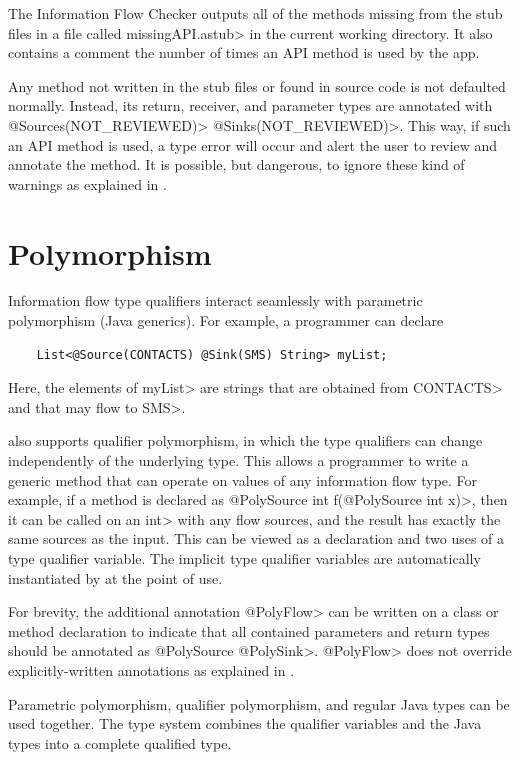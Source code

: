  The Information Flow Checker  outputs all of the methods missing from the stub files in
  a file called \<missingAPI.astub> in the current working directory. It also 
  contains a comment the number of times an API method is used by the app.

Any method not written in the stub files or found in source code is not defaulted normally. 
 Instead, its return, receiver, and parameter types are annotated with \<@Sources(NOT\_REVIEWED)> 
 \<@Sinks(NOT\_REVIEWED)>. 
 This way, if such an API method is used, a type error
  will occur and alert the user to review and annotate the method. It is possible, but dangerous, to ignore these kind of warnings as explained in .


\section{Polymorphism \label{sec:polyflowsources}}


Information flow type qualifiers interact seamlessly with parametric polymorphism (Java
generics).  For example, a programmer can declare

\begin{Verbatim}
    List<@Source(CONTACTS) @Sink(SMS) String> myList;
\end{Verbatim}
\noindent
Here, the elements of \<myList> are strings
that are obtained from \<CONTACTS> and that may flow to \<SMS>.

\TheFlowChecker also supports qualifier polymorphism, in
which the type qualifiers can change independently of the underlying type.
This allows a programmer to write a generic method that can operate on values of
any information flow type.
For example, if a method is declared as
\<@PolySource int f(@PolySource int x)>, then it can be called on an \<int>
with any flow sources, and the result has exactly the same sources as the
input.  This can be viewed as a declaration and two uses of a type
qualifier variable.  The implicit type qualifier variables are
automatically instantiated by \theFlowChecker at the point of use.

For brevity,
the additional
annotation \<@PolyFlow> can be written on a class or method declaration to indicate that
all contained parameters and return types should be annotated as \<@PolySource
@PolySink>.  \<@PolyFlow> does not override explicitly-written annotations as explained
in .


Parametric polymorphism, qualifier polymorphism, and regular Java types can
be used together.  The type system combines the
qualifier variables and the Java types into a complete qualified type.

